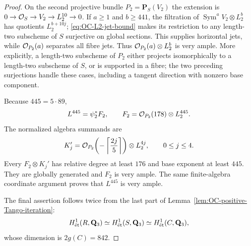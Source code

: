 \begin{proof}
On the second projective bundle $P_2=\mathbf P_S(V_2)$ the extension is $0\to\OO_S\to V_2\to L_2^{10}\to0$.  If $a\geq1$ and $b\geq441$, the filtration of $\operatorname{Sym}^aV_2\otimes L_2^b$ has quotients $L_2^{b+10j}$; \eqref{eq:OC-L2-jet-bound} makes its restriction to any length-two subscheme of $S$ surjective on global sections.  This supplies horizontal jets, while $\OO_{P_2}(a)$ separates all fibre jets.  Thus $\OO_{P_2}(a)\otimes L_2^b$ is very ample.  More explicitly, a length-two subscheme of $P_2$ either projects isomorphically to a length-two subscheme of $S$, or is supported in a fibre; the two preceding surjections handle these cases, including a tangent direction with nonzero base component.

Because $445=5\cdot89$,
\[
 L^{445}=\psi_2^*F_2,
 \qquad F_2=\OO_{P_2}(178)\otimes L_2^{445}.
\]
The normalized algebra summands are
\[
 K_j'=\OO_{P_2}\!\left(-\left\lceil\frac{2j}{5}\right\rceil\right)
                              \otimes L_2^{4j},\qquad0\leq j\leq4.
\]
Every $F_2\otimes K_j'$ has relative degree at least $176$ and base exponent at least $445$.  They are globally generated and $F_2$ is very ample.  The same finite-algebra coordinate argument proves that $L^{445}$ is very ample.

The final assertion follows twice from the last part of Lemma~\ref{lem:OC-positive-Tango-iteration}:
\[
       H^1_{\et}(R,\mathbf Q_3)\simeq H^1_{\et}(S,\mathbf Q_3)
                      \simeq H^1_{\et}(C,\mathbf Q_3),
\]
whose dimension is $2g(C)=842$.
\end{proof}

